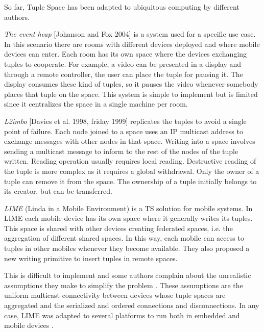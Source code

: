 So far, Tuple Space has been adapted to ubiquitous computing by different authors.

\emph{The event heap} [Johanson and Fox 2004] is a system used for a specific use case. %
In this scenario there are rooms with different devices deployed and where mobile devices can enter.
Each room has its own space where the devices exchanging tuples to cooperate.
For example, a video can be presented in a display and through a remote controller, the user can place the tuple for pausing it.
The display consumes these kind of tuples, so it pauses the video whenever somebody places that tuple on the space.
This system is simple to implement but is limited since it centralizes the space in a single machine per room. %


\emph{L2imbo} [Davies et al. 1998, friday 1999] replicates the tuples to avoid a single point of failure. %
Each node joined to a space uses an IP multicast address to exchange messages with other nodes in that space.
Writing into a space involves sending a multicast message to inform to the rest of the nodes of the tuple written.
Reading operation usually requires local reading.
Destructive reading of the tuple is more complex as it requires a global withdrawal.
Only the owner of a tuple can remove it from the space.
The ownership of a tuple initially belongs to its creator, but can be transferred. %


\emph{LIME} (Linda in a Mobile Environment) \cite{picco_lime:_1999} is a TS solution for mobile systems.
In LIME each mobile device has its own space where it generally writes its tuples.
This space is shared with other devices creating federated spaces, i.e. the aggregation of different shared spaces.
In this way, each mobile can access to tuples in other mobiles whenever they become available.
They also proposed a new writing primitive to insert tuples in remote spaces.

This is difficult to implement and some authors complain about the unrealistic assumptions they make to simplify the problem \cite{coulouris_distributed_2012}. %
These assumptions are the uniform multicast connectivity between devices whose tuple spaces are aggregated and the serialized and ordered connections and disconnections.
In any case, LIME was adapted to several platforms to run both in embedded and mobile devices \cite{murphy_transiently_2006}.


